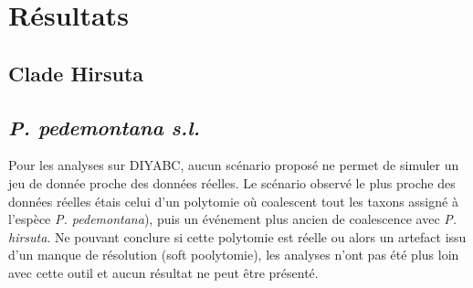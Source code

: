 \section{Résultats}






\subsection{Clade Hirsuta}




\subsection{\textit{P. pedemontana s.l.}}

Pour les analyses sur DIYABC, aucun scénario proposé ne permet de simuler un jeu de donnée proche des données réelles. 
Le scénario observé le plus proche des données réelles étais celui d'un polytomie où coalescent tout les taxons assigné à l'espèce \textit{P. pedemontana}), puis un événement plus ancien de coalescence avec \textit{P. hirsuta}.
Ne pouvant conclure si cette polytomie est réelle ou alors un artefact issu d'un manque de résolution (soft poolytomie), les analyses n'ont pas été plus loin avec cette outil et aucun résultat ne peut être présenté.

